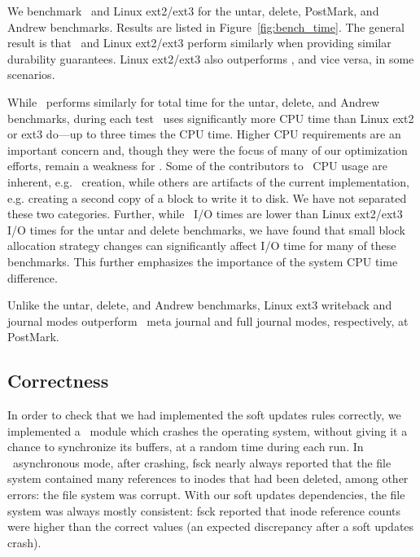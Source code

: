 We benchmark \Kudos\ and Linux ext2/ext3 for the untar, delete,
PostMark, and Andrew benchmarks. Results are listed in
Figure~\ref{fig:bench_time}.
%
The general result is that \Kudos\ and Linux ext2/ext3 perform
similarly when providing similar durability guarantees. Linux
ext2/ext3 also outperforms \Kudos, and vice versa, in some scenarios.

\benchtable{}

While \Kudos\ performs similarly for total time for the untar, delete,
and Andrew benchmarks, during each test \Kudos\ uses significantly
more CPU time than Linux ext2 or ext3 do---up to three times the CPU
time.
%
Higher CPU requirements are an important concern and, though they were
the focus of many of our optimization efforts, remain a weakness
for \Kudos.
%
Some of the contributors to \Kudos\ CPU usage are inherent, e.g.
\patch\ creation, while others are artifacts of the current
implementation, e.g.  creating a second copy of a block to write it to
disk. We have not separated these two categories.
%
Further, while \Kudos\ I/O times are lower than Linux ext2/ext3 I/O
times for the untar and delete benchmarks, we have found that small
block allocation strategy changes can significantly affect I/O time
for many of these benchmarks. This further emphasizes the importance
of the system CPU time difference.

Unlike the untar, delete, and Andrew benchmarks, Linux ext3 writeback
and journal modes outperform \Kudos\ meta journal and full journal
modes, respectively, at PostMark.


\subsection {Correctness}
\label{sec:eval:correctness}

In order to check that we had implemented the soft updates rules correctly,
we implemented a \Kudos\ module which crashes the operating system, without
giving it a chance to synchronize its buffers, at a random time during each
run.
%
In \Kudos\ asynchronous mode, after crashing, fsck nearly always reported
that the file system contained many references to inodes that had been
deleted, among other errors: the file system was corrupt.
%
With our soft updates dependencies, the file system was always mostly
consistent: fsck reported that inode reference counts were higher than the
correct values (an expected discrepancy after a soft updates crash).

